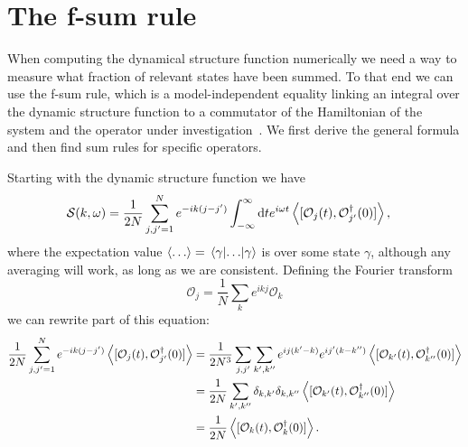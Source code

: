 \documentclass[11pt, a4paper]{report} %
\begin{document}
\chapter{The f-sum rule}\label{cha:f-sum-rule}

When computing the dynamical structure function numerically we need a way to measure what fraction of relevant states have been summed.
To that end we can use the f-sum rule, which is a model-independent equality linking an integral over the dynamic structure function to a commutator of the Hamiltonian of the system and the operator under investigation~\cite{pitaevskii}.
We first derive the general formula and then find sum rules for specific operators.

Starting with the dynamic structure function we have
\begin{align}
  	\mathcal{S}(k,\omega) &= \frac{1}{2N} \sum_{j,j'=1}^{N} e^{-ik(j-j')} \int_{-\infty}^{\infty}\dd t e^{i\omega t}\expval{[\mathcal{O}_j(t),\mathcal{O}_{j'}^{\dagger}(0)]},
\end{align}
where the expectation value \(\expval{\ldots} = \matrixel{\gamma}{\ldots}{\gamma}\) is over some state \(\gamma\), although any averaging will work, as long as we are consistent.
Defining the Fourier transform
\begin{equation}
  \mathcal{O}_j = \frac{1}{N} \sum_k e^{ikj} \mathcal{O}_k
\end{equation}
we can rewrite part of this equation:
\begin{align}
  \frac{1}{2N} \sum_{j,j'=1}^{N} e^{-ik(j-j')} \expval{[\mathcal{O}_j(t),\mathcal{O}_{j'}^{\dagger}(0)]} &= \frac{1}{2N^3} \sum_{j, j'}\sum_{k',k''} e^{ij(k'-k)}e^{ij'(k-k'')}  \expval{[\mathcal{O}_{k'}(t),\mathcal{O}_{k''}^{\dagger}(0)]}\\
&= \frac{1}{2N} \sum_{k',k''} \delta_{k,k'}\delta_{k,k''}  \expval{[\mathcal{O}_{k'}(t),\mathcal{O}_{k''}^{\dagger}(0)]} \\
&= \frac{1}{2N}  \expval{[\mathcal{O}_{k}(t),\mathcal{O}_{k}^{\dagger}(0)]}.
\end{align}
\end{document}
